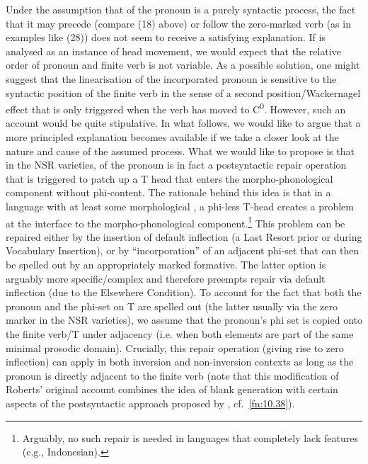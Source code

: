 \documentclass[output=paper]{langsci/langscibook}
\begin{document}
Under the assumption that  of the pronoun is a purely syntactic
process, the fact that it may precede (compare (18) above) or follow the
zero-marked verb (as in examples like (28)) does not seem to receive a
satisfying explanation. If  is analysed as an instance of head
movement, we would expect that the relative order of pronoun and finite verb is
not variable. As a possible solution, one might suggest that the linearisation
of the incorporated pronoun is sensitive to the syntactic position of the
finite verb in the sense of a second position/Wackernagel effect that is only
triggered when the verb has moved to C\textsuperscript{0}. However, such an account would
be quite stipulative. In what follows, we would like to argue that a more
principled explanation becomes available  if we take a closer look at the
nature and cause of the assumed  process. What we would like to
propose is that in the \gls{NSR} varieties,  of the pronoun is in
fact a postsyntactic repair operation that is triggered to patch up a T head
that enters the morpho-phonological component without phi-content. The
rationale behind this idea is that in a language with at least some
morphological , a phi-less T-head creates a problem at the interface
to the morpho-phonological component.\footnote{Arguably, no such repair is
    needed in languages that completely lack  features (e.g.,
Indonesian).} This problem can be repaired either by the insertion of default
inflection (a Last Resort prior or during Vocabulary Insertion), or by
``incorporation'' of an adjacent phi-set that can then be spelled out by an
appropriately marked  formative. The latter option is arguably more
specific/complex and therefore preempts repair via default inflection (due to
the Elsewhere Condition). To account for the fact that both the pronoun and the
phi-set on T are spelled out (the latter usually via the zero marker in the
\gls{NSR} varieties), we assume that the pronoun's phi set is copied onto the
finite verb/T under adjacency (i.e. when both elements are part of the same
minimal prosodic domain). Crucially, this repair operation (giving rise to zero
inflection) can apply in both inversion and non-inversion contexts as long as
the pronoun is directly adjacent to the finite verb (note that this
modification of Roberts' original account combines the idea of blank generation
with certain aspects of the postsyntactic approach proposed by
\citealt{TripsFuss:2010}, cf.~\cref{fn:10.38}).
\end{document}
